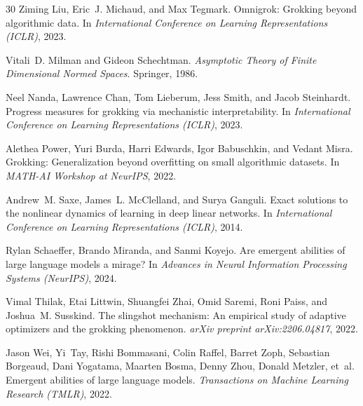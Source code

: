 \documentclass{article}
\begin{document}
\begin{thebibliography}{30}
Ziming Liu, Eric~J. Michaud, and Max Tegmark.
\newblock Omnigrok: Grokking beyond algorithmic data.
\newblock In \emph{International Conference on Learning Representations (ICLR)}, 2023.

Vitali~D. Milman and Gideon Schechtman.
\newblock \emph{Asymptotic Theory of Finite Dimensional Normed Spaces}.
\newblock Springer, 1986.

Neel Nanda, Lawrence Chan, Tom Lieberum, Jess Smith, and Jacob Steinhardt.
\newblock Progress measures for grokking via mechanistic interpretability.
\newblock In \emph{International Conference on Learning Representations (ICLR)}, 2023.

Alethea Power, Yuri Burda, Harri Edwards, Igor Babuschkin, and Vedant Misra.
\newblock Grokking: Generalization beyond overfitting on small algorithmic datasets.
\newblock In \emph{MATH-AI Workshop at NeurIPS}, 2022.

Andrew~M. Saxe, James~L. McClelland, and Surya Ganguli.
\newblock Exact solutions to the nonlinear dynamics of learning in deep linear networks.
\newblock In \emph{International Conference on Learning Representations (ICLR)}, 2014.

Rylan Schaeffer, Brando Miranda, and Sanmi Koyejo.
\newblock Are emergent abilities of large language models a mirage?
\newblock In \emph{Advances in Neural Information Processing Systems (NeurIPS)}, 2024.

Vimal Thilak, Etai Littwin, Shuangfei Zhai, Omid Saremi, Roni Paiss, and Joshua~M. Susskind.
\newblock The slingshot mechanism: An empirical study of adaptive optimizers and the grokking phenomenon.
\newblock \emph{arXiv preprint arXiv:2206.04817}, 2022.

Jason Wei, Yi~Tay, Rishi Bommasani, Colin Raffel, Barret Zoph, Sebastian Borgeaud, Dani Yogatama, Maarten Bosma, Denny Zhou, Donald Metzler, et~al.
\newblock Emergent abilities of large language models.
\newblock \emph{Transactions on Machine Learning Research (TMLR)}, 2022.

\end{thebibliography}


\newpage
\appendix
\end{document}
